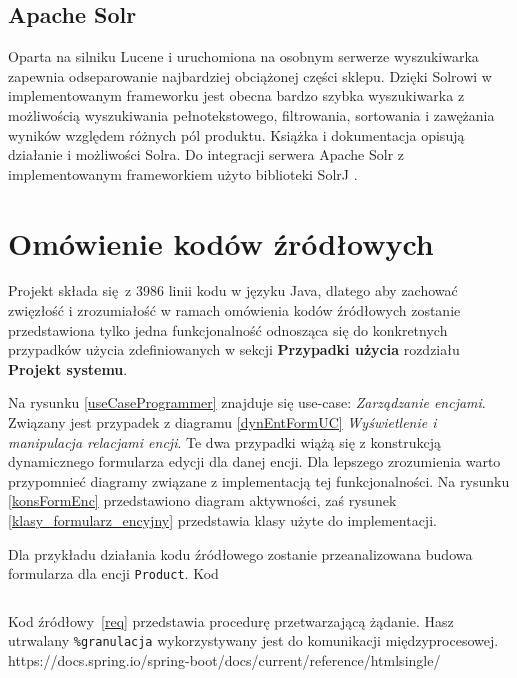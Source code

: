 \subsection{Apache Solr} 
Oparta na silniku Lucene i uruchomiona na osobnym serwerze wyszukiwarka zapewnia odseparowanie najbardziej obciążonej części sklepu. Dzięki Solrowi w implementowanym frameworku jest obecna bardzo szybka wyszukiwarka z możliwością wyszukiwania pełnotekstowego, filtrowania, sortowania i zawężania wyników względem różnych pól produktu. Książka \cite{solrbook} i dokumentacja \cite{Solr-doc} opisują działanie i możliwości Solra. Do integracji serwera Apache Solr z implementowanym frameworkiem użyto biblioteki SolrJ \cite{solrJ}.

\section{Omówienie kodów źródłowych}
Projekt składa się z 3986 linii kodu w języku Java, dlatego aby zachować zwięzłość i zrozumiałość w ramach omówienia kodów źródłowych zostanie przedstawiona tylko jedna funkcjonalność odnosząca się do konkretnych przypadków użycia zdefiniowanych w sekcji \textbf{Przypadki użycia} rozdziału \textbf{Projekt systemu}. 

Na rysunku \ref{useCaseProgrammer} znajduje się use-case: \textit{Zarządzanie encjami}. Związany jest przypadek z diagramu \ref{dynEntFormUC} \textit{Wyświetlenie i manipulacja relacjami encji}.  Te dwa przypadki wiążą się z konstrukcją dynamicznego formularza edycji dla danej encji. Dla lepszego zrozumienia warto przypomnieć diagramy związane z implementacją tej funkcjonalności. Na rysunku \ref{konsFormEnc} przedstawiono diagram aktywności, zaś rysunek \ref{klasy_formularz_encyjny} przedstawia klasy użyte do implementacji.

Dla przykładu działania kodu źródłowego zostanie przeanalizowana budowa formularza dla encji \texttt{Product}. Kod 

\begin{small}
\begin{lstlisting}[language=Java, frame=lines, numberstyle=\tiny, stepnumber=5, caption=Wyświetlenie formularza encyjnego: \texttt{DynamicEntityController.java}\label{ws}., firstnumber=1]


\end{lstlisting} 
\end{small}

{\color{dgray}
Kod źródłowy~\ref{req} przedstawia procedurę przetwarzającą żądanie. Hasz utrwalany \verb|%granulacja| wykorzystywany jest do komunikacji międzyprocesowej.
}https://docs.spring.io/spring-boot/docs/current/reference/htmlsingle/

